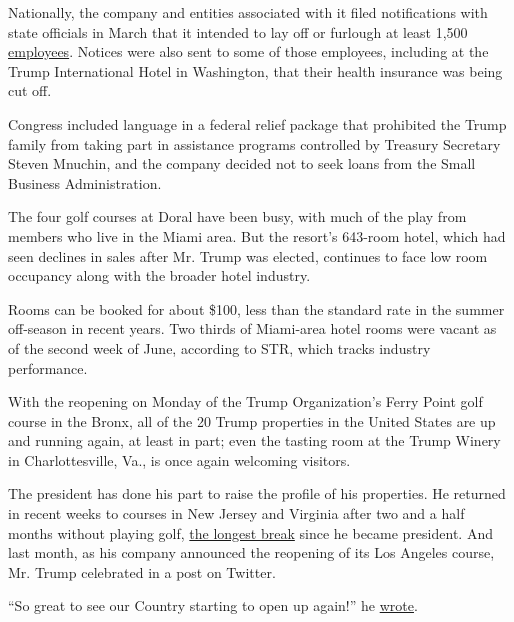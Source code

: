 Nationally, the company and entities associated with it filed
notifications with state officials in March that it intended to lay off
or furlough at least 1,500
\href{https://www.documentcloud.org/documents/6955074-Warns-ALL.html}{employees}.
Notices were also sent to some of those employees, including at the
Trump International Hotel in Washington, that their health insurance was
being cut off.

Congress included language in a federal relief package that prohibited
the Trump family from taking part in assistance programs controlled by
Treasury Secretary Steven Mnuchin, and the company decided not to seek
loans from the Small Business Administration.

The four golf courses at Doral have been busy, with much of the play
from members who live in the Miami area. But the resort's 643-room
hotel, which had seen declines in sales after Mr. Trump was elected,
continues to face low room occupancy along with the broader hotel
industry.

Rooms can be booked for about \$100, less than the standard rate in the
summer off-season in recent years. Two thirds of Miami-area hotel rooms
were vacant as of the second week of June, according to STR, which
tracks industry performance.

With the reopening on Monday of the Trump Organization's Ferry Point
golf course in the Bronx, all of the 20 Trump properties in the United
States are up and running again, at least in part; even the tasting room
at the Trump Winery in Charlottesville, Va., is once again welcoming
visitors.

The president has done his part to raise the profile of his properties.
He returned in recent weeks to courses in New Jersey and Virginia after
two and a half months without playing golf,
\href{https://www.nytimes3xbfgragh.onion/interactive/2017/04/05/us/politics/tracking-trumps-visits-to-his-branded-properties.html}{the
longest break} since he became president. And last month, as his company
announced the reopening of its Los Angeles course, Mr. Trump celebrated
in a post on Twitter.

``So great to see our Country starting to open up again!'' he
\href{https://twitter.com/realDonaldTrump/status/1259449226465083394?ref_src=twsrc\%5Etfw\%7Ctwcamp\%5Etweetembed\%7Ctwterm\%5E1259449226465083394\&ref_url=https\%3A\%2F\%2Fwww.haaretz.com\%2Fscience-and-health\%2Ftrump-tweets-promo-for-his-la-golf-course-as-u-s-death-toll-passes-80-000-1.8837932}{wrote}.

